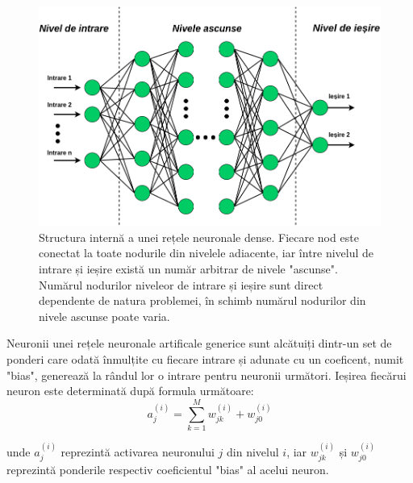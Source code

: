 \documentclass[a4paper,12pt]{book}
\begin{document}
			\begin{figure}[t]
			\centering
			\hspace*{0,8cm}
			\includegraphics[scale=0.60]{nns}
			\caption{Structura internă a unei rețele neuronale dense. Fiecare nod este conectat la toate nodurile din nivelele adiacente, iar între nivelul de intrare și ieșire există un număr arbitrar de nivele "ascunse". Numărul nodurilor niveleor de intrare și ieșire sunt direct dependente de natura problemei, în schimb numărul nodurilor din nivele ascunse poate varia.} 
			\label{fig:nns}
			\end{figure}	
			
			Neuronii unei rețele neuronale artificale generice sunt alcătuiți dintr-un set de ponderi care odată înmulțite cu fiecare intrare și adunate cu un coeficent, numit "bias", generează la rândul lor o intrare pentru neuronii următori. 
			\noindent Ieșirea fiecărui neuron este determinată după formula următoare:
			\begin{equation}
					a_j^{(i)} = \sum_{k=1}^{M} w_{jk}^{(i)} + w_{j0}^{(i)}
			\end{equation}
			
			unde $a_j^{(i)}$ reprezintă activarea neuronului $j$ din nivelul $i$, iar $w_{jk}^{(i)}$ și $w_{j0}^{(i)}$ reprezintă ponderile respectiv coeficientul "bias" al acelui neuron. \par
			
\end{document}
